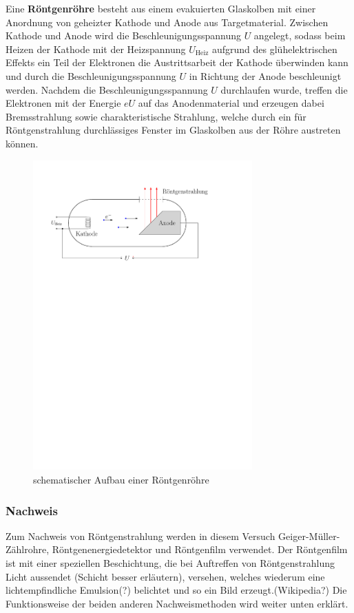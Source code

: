 \documentclass[10pt, a4paper]{article}
\begin{document}
Eine \textbf{Röntgenröhre} besteht aus einem evakuierten Glaskolben mit einer Anordnung von geheizter Kathode und Anode aus Targetmaterial.
Zwischen Kathode und Anode wird die Beschleunigungsspannung $U$ angelegt, sodass beim Heizen der Kathode mit der Heizspannung $U_\mathrm{Heiz}$ aufgrund des glühelektrischen Effekts ein Teil der Elektronen die Austrittsarbeit der Kathode überwinden kann und durch die Beschleunigungsspannung $U$ in Richtung der Anode beschleunigt werden.
Nachdem die Beschleunigungsspannung $U$ durchlaufen wurde, treffen die Elektronen mit der Energie $e U$ auf das Anodenmaterial und erzeugen dabei Bremsstrahlung sowie charakteristische Strahlung, welche durch ein für Röntgenstrahlung durchlässiges Fenster im Glaskolben aus der Röhre austreten können.
\begin{figure}[h]
\centering
\includegraphics[width=0.75\textwidth]{./grafiken/roentgenroehre.pdf}
\caption{schematischer Aufbau einer Röntgenröhre}
\label{fig:roehre}
\end{figure}

\subsubsection{Nachweis}
Zum Nachweis von Röntgenstrahlung werden in diesem Versuch Geiger-Müller-Zählrohre, Röntgenenergiedetektor und Röntgenfilm verwendet.
Der Röntgenfilm ist mit einer speziellen Beschichtung, die bei Auftreffen von Röntgenstrahlung Licht aussendet (Schicht besser erläutern), versehen, welches wiederum eine lichtempfindliche Emulsion(?) belichtet und so ein Bild erzeugt.(Wikipedia?)
Die Funktionsweise der beiden anderen Nachweismethoden wird weiter unten erklärt.
\end{document}
